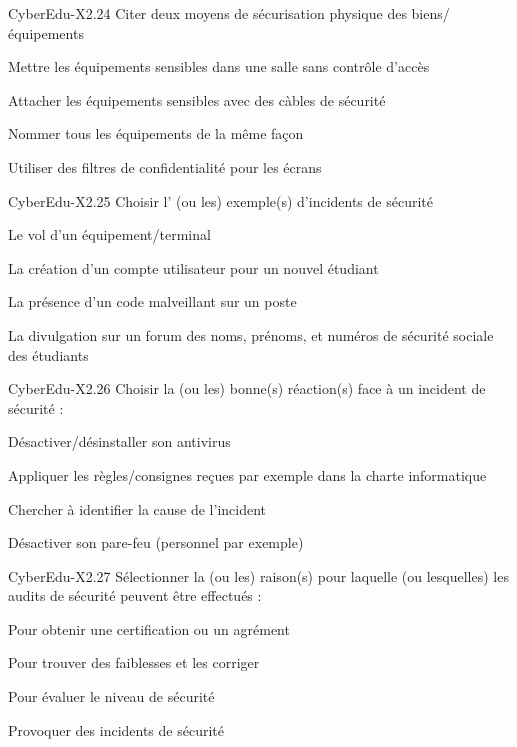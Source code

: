 \begin{multi}[multiple=true]{CyberEdu-X2.24}
	Citer deux moyens de sécurisation physique des biens/équipements
\item Mettre les équipements sensibles dans une salle sans contrôle d'accès
\item* Attacher les équipements sensibles avec des càbles de sécurité
\item Nommer tous les équipements de la même façon
\item* Utiliser des filtres de confidentialité pour les écrans
\end{multi}

\begin{multi}[multiple=true]{CyberEdu-X2.25}
	Choisir l' (ou les) exemple(s) d'incidents de sécurité
\item* Le vol d'un équipement/terminal
\item La création d'un compte utilisateur pour un nouvel étudiant
\item* La présence d'un code malveillant sur un poste
\item* La divulgation sur un forum des noms, prénoms, et numéros de sécurité sociale des étudiants
\end{multi}

\begin{multi}[multiple=true]{CyberEdu-X2.26}
	Choisir la (ou les) bonne(s) réaction(s) face à un incident de sécurité :
\item Désactiver/désinstaller son antivirus
\item* Appliquer les règles/consignes reçues par exemple dans la charte informatique
\item* Chercher à identifier la cause de l'incident
\item Désactiver son pare-feu (personnel par exemple)
\end{multi}

\begin{multi}[multiple=true]{CyberEdu-X2.27}
	Sélectionner la (ou les) raison(s) pour laquelle (ou lesquelles) les audits de sécurité peuvent être effectués :
\item* Pour obtenir une certification ou un agrément
\item* Pour trouver des faiblesses et les corriger
\item* Pour évaluer le niveau de sécurité
\item Provoquer des incidents de sécurité
\end{multi}


